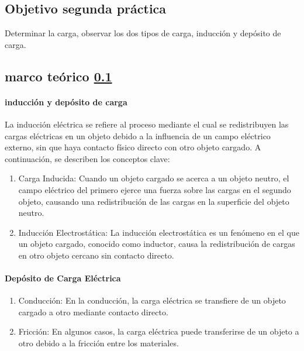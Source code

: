 \documentclass{article}
\begin{document}
\begin{multicols}{2}
\subsection{Objetivo segunda práctica}\label{Objetivo segunda práctica}	
	Determinar la carga, observar los dos tipos de carga, inducción y depósito de carga.
	\subsection{marco teórico \ref{Objetivo segunda práctica}}
	\paragraph*{inducción y depósito de carga}
	La inducción eléctrica se refiere al proceso mediante el cual se redistribuyen
	las cargas eléctricas en un objeto debido a la influencia de un campo eléctrico externo,
	sin que haya contacto físico directo con otro objeto cargado. A continuación, se describen
	los conceptos clave:

	\begin{enumerate}
		\item Carga Inducida: Cuando un objeto cargado se acerca a un objeto neutro, el campo eléctrico del primero ejerce una fuerza sobre las cargas en el segundo objeto, causando una redistribución de las cargas en la superficie del objeto neutro.

\item Inducción Electrostática: La inducción electrostática es un fenómeno en el que un objeto cargado, conocido como inductor, causa la redistribución de cargas en otro objeto cercano sin contacto directo.

\end{enumerate}

\paragraph*{Depósito de Carga Eléctrica}

\cite{Openstax College Physics}
\begin{enumerate}

\item Conducción: En la conducción, la carga eléctrica se transfiere de un objeto cargado a otro mediante contacto directo.

\item Fricción: En algunos casos, la carga eléctrica puede transferirse de un objeto a otro debido a la fricción entre los materiales.


\end{enumerate}
\end{multicols}
\end{document}
